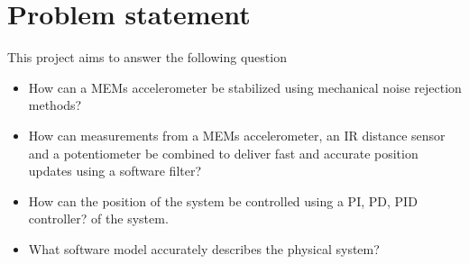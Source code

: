\section*{Problem statement}
This project aims to answer the following question
\begin{itemize}
	\item How can a MEMs accelerometer be stabilized using mechanical noise rejection methods?
	\item How can measurements from a MEMs accelerometer, an IR distance sensor 
		and a potentiometer be combined to deliver fast and accurate position updates
		using a software filter?
	\item How can the position of the system be controlled using a PI, PD, PID controller?
		of the system.
	\item What software model accurately describes the physical system?
\end{itemize}

